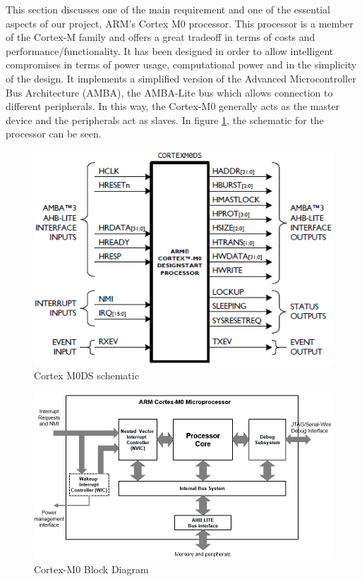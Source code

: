 

This section discusses one of the main requirement and one of the essential aspects of our project, ARM’s Cortex M0 processor. This processor is a member of the Cortex-M family and offers a great tradeoff in terms of costs and performance/functionality. It has been designed in order to allow intelligent compromises in terms of power usage, computational power and in the simplicity of the design. It implements a simplified version of the Advanced Microcontroller Bus Architecture (AMBA), the AMBA-Lite bus which allows connection to different peripherals. In this way, the Cortex-M0 generally acts as the master device and the peripherals act as slaves. In figure \ref{fig:cortexm0ds}, the schematic for the processor can be seen.\\
\begin{figure}
\centering
\includegraphics[scale=0.7]{figures/cortexm0ds_schematic.PNG}
\caption{Cortex M0DS schematic \label{fig:cortexm0ds}}
\end{figure}
\clearpage

\begin{figure}
\centering
\includegraphics[scale=0.7]{figures/arm_cortexm0_microprocessor.PNG}
\caption{Cortex-M0 Block Diagram \label{fig:cortex_block}}
\end{figure}

